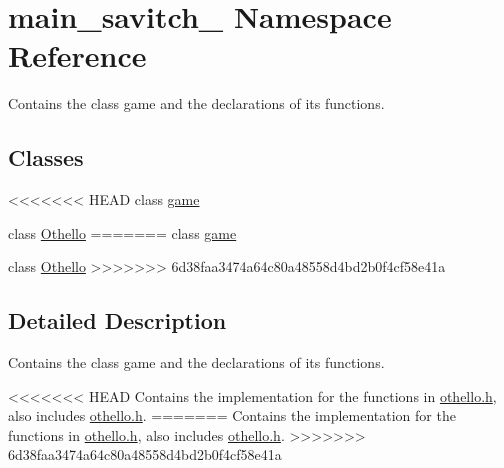 \hypertarget{namespacemain__savitch__14}{}\section{main\+\_\+savitch\+\_ Namespace Reference}
\label{namespacemain__savitch__14}


Contains the class game and the declarations of its functions.  


\subsection*{Classes}
\begin{DoxyCompactItemize}
\item 
<<<<<<< HEAD
class \mbox{\hyperlink{classmain__savitch__14_1_1game}{game}}
\item 
class \mbox{\hyperlink{classmain__savitch__14_1_1_othello}{Othello}}
=======
class \hyperlink{classmain__savitch__14_1_1game}{game}
\item 
class \hyperlink{classmain__savitch__14_1_1Othello}{Othello}
>>>>>>> 6d38faa3474a64c80a48558d4bd2b0f4cf58e41a
\end{DoxyCompactItemize}


\subsection{Detailed Description}
Contains the class game and the declarations of its functions. 

<<<<<<< HEAD
Contains the implementation for the functions in \mbox{\hyperlink{othello_8h_source}{othello.\+h}}, also includes \mbox{\hyperlink{othello_8h_source}{othello.\+h}}. 
=======
Contains the implementation for the functions in \hyperlink{othello_8h_source}{othello.\+h}, also includes \hyperlink{othello_8h_source}{othello.\+h}. 
>>>>>>> 6d38faa3474a64c80a48558d4bd2b0f4cf58e41a
